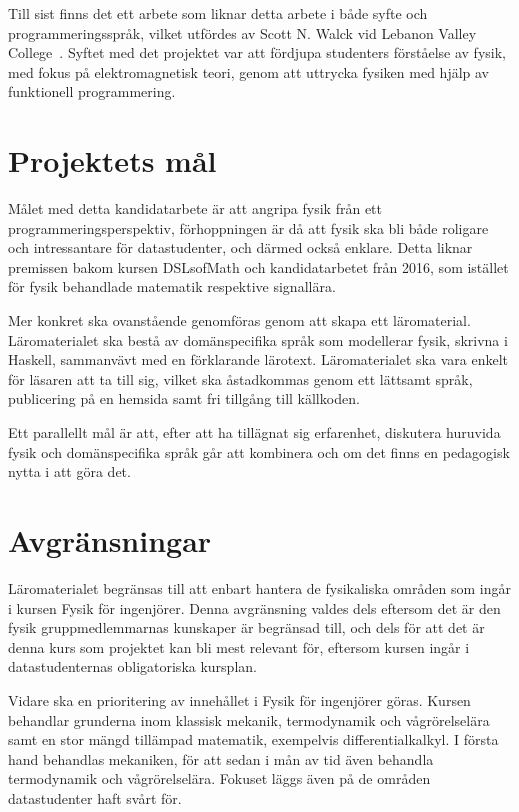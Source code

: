 Till sist finns det ett arbete som liknar detta arbete i både syfte och
programmeringsspråk, vilket utfördes av Scott N. Walck vid Lebanon Valley
College~\cite{lebanon-physics}. Syftet med det projektet var att fördjupa
studenters förståelse av fysik, med fokus på elektromagnetisk teori, genom att
uttrycka fysiken med hjälp av funktionell programmering.

\section{Projektets mål}

Målet med detta kandidatarbete är att angripa fysik från ett
programmeringsperspektiv, förhoppningen är då att fysik ska bli både
roligare och intressantare för datastudenter, och därmed också
enklare. Detta liknar premissen bakom kursen DSLsofMath och kandidatarbetet
från 2016, som istället för fysik behandlade matematik respektive signallära.

Mer konkret ska ovanstående genomföras genom att skapa ett läromaterial.
Läromaterialet ska bestå av
domänspecifika språk som modellerar fysik, skrivna
i Haskell,
sammanvävt med en förklarande lärotext. Läromaterialet ska vara
enkelt för läsaren att ta till sig, vilket ska åstadkommas genom ett lättsamt
språk, publicering på en hemsida samt fri tillgång till källkoden.

Ett parallellt mål är att, efter att ha tillägnat sig erfarenhet, diskutera
huruvida fysik och domänspecifika språk går att kombinera och om det finns en
pedagogisk nytta i att göra det.

\section{Avgränsningar}\label{sec:avgransningar}

Läromaterialet begränsas till att enbart hantera de fysikaliska områden
som ingår i kursen Fysik för ingenjörer. Denna avgränsning valdes dels eftersom
det är den fysik gruppmedlemmarnas kunskaper är begränsad till, och dels för att
det är denna kurs som projektet kan bli mest relevant för, eftersom
kursen ingår i datastudenternas obligatoriska kursplan.

Vidare ska en prioritering av innehållet i Fysik för ingenjörer göras.
Kursen behandlar grunderna inom klassisk mekanik, termodynamik och
vågrörelselära samt en stor mängd tillämpad matematik, exempelvis
differentialkalkyl. I första hand behandlas mekaniken, för att sedan i mån
av tid även behandla termodynamik och vågrörelselära. Fokuset läggs även
på de områden datastudenter haft svårt för.

